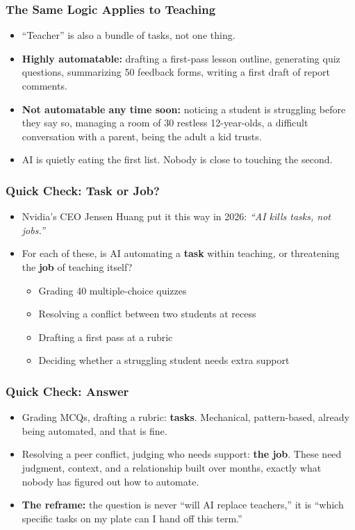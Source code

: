 \begin{frame}[fragile]\frametitle{The Same Logic Applies to Teaching}
\begin{itemize}
\item ``Teacher'' is also a bundle of tasks, not one thing.
\item \textbf{Highly automatable:} drafting a first-pass lesson outline, generating quiz questions, summarizing 50 feedback forms, writing a first draft of report comments.
\item \textbf{Not automatable any time soon:} noticing a student is struggling before they say so, managing a room of 30 restless 12-year-olds, a difficult conversation with a parent, being the adult a kid trusts.
\item AI is quietly eating the first list. Nobody is close to touching the second.
\end{itemize}
\end{frame}

\begin{frame}[fragile]\frametitle{Quick Check: Task or Job?}
\begin{itemize}
\item Nvidia's CEO Jensen Huang put it this way in 2026: \emph{``AI kills tasks, not jobs.''}
\item For each of these, is AI automating a \textbf{task} within teaching, or threatening the \textbf{job} of teaching itself?
\begin{itemize}
\item Grading 40 multiple-choice quizzes
\item Resolving a conflict between two students at recess
\item Drafting a first pass at a rubric
\item Deciding whether a struggling student needs extra support
\end{itemize}
\end{itemize}
\end{frame}

\begin{frame}[fragile]\frametitle{Quick Check: Answer}
\begin{itemize}
\item Grading MCQs, drafting a rubric: \textbf{tasks}. Mechanical, pattern-based, already being automated, and that is fine.
\item Resolving a peer conflict, judging who needs support: \textbf{the job}. These need judgment, context, and a relationship built over months, exactly what nobody has figured out how to automate.
\item \textbf{The reframe:} the question is never ``will AI replace teachers,'' it is ``which specific tasks on my plate can I hand off this term.''
\end{itemize}
\end{frame}

